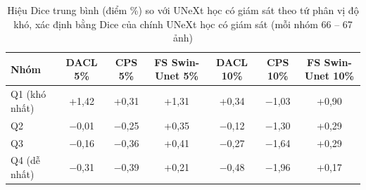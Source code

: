 \begin{table}[!t]
\caption{Hiệu Dice trung bình (điểm \%) so với UNeXt học có giám sát theo tứ phân vị độ khó, xác định bằng Dice của chính UNeXt học có giám sát (mỗi nhóm 66 -- 67 ảnh)}
\label{tab:quartile}
\centering
\setlength{\tabcolsep}{6pt}
\begin{tabular}{|l|c|c|c|c|c|c|}
\hline
Nhóm & DACL 5\% & CPS 5\% & FS Swin-Unet 5\% & DACL 10\% & CPS 10\% & FS Swin-Unet 10\% \\
\hline
Q1 (khó nhất) & +1,42 & +0,31 & +1,31 & +0,34 & $-$1,03 & +0,90 \\
Q2 & $-$0,01 & $-$0,25 & +0,35 & $-$0,12 & $-$1,30 & +0,29 \\
Q3 & $-$0,16 & $-$0,36 & +0,41 & $-$0,27 & $-$1,64 & +0,29 \\
Q4 (dễ nhất) & $-$0,31 & $-$0,39 & +0,21 & $-$0,48 & $-$1,96 & +0,17 \\
\hline
\end{tabular}
\end{table}
